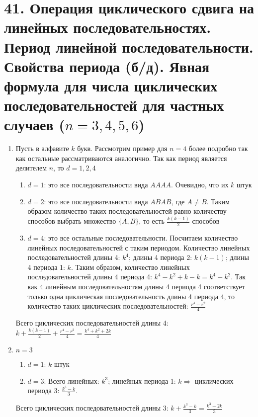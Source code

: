 \section*{41. Операция циклического сдвига на линейных последовательностях. Период линейной последовательности. Свойства периода (б/д). Явная формула для числа циклических последовательностей для частных случаев ($n = 3, 4, 5, 6$)}
\begin{enumerate}
    \item Пусть в алфавите $k$ букв. Рассмотрим пример для $n=4$ более подробно так как остальные рассматриваются аналогично. Так как период является делителем $n$, то $d=1,2,4$
\begin{enumerate}
    \item $d=1$: это все последовательности вида $AAAA$. Очевидно, что их $k$ штук
    \item $d=2$: это все последовательности вида $ABAB$, где $A \neq B$. Таким образом количество таких последовательностей равно количеству способов выбрать множество $\{A, B\}$, то есть $\frac{k(k-1)}{2}$ способов
    \item $d=4$: это все остальные последовательности. Посчитаем количество линейных последовательностей с таким периодом. Количество линейных последовательностей длины 4: $k^4$; длины 4 периода 2: $k(k-1)$; длины 4 периода 1: $k$. Таким образом, количество линейных последовательностей длины 4 периода 4: $k^4-k^2+k-k=k^4-k^2$. Так как 4 линейным последовательностям длины 4 периода 4 соответствует только одна циклическая последовательность длины 4 периода 4, то количество таких циклических последовательностей: $\frac{r^4-r^2}{4}$
\end{enumerate}
\par Всего циклических последовательностей длины 4: $k+\frac{k(k-1)}{2}+\frac{r^4-r^2}{4}=\frac{k^4+k^2+2k}{4}$
\item $n=3$
\begin{enumerate}
    \item $d=1$: $k$ штук
    \item $d=3$: Всего линейных: $k^3$; линейных периода 1: $k \Rightarrow$ циклических периода 3: $\frac{k^3-k}{3}$.
\end{enumerate}
\par Всего циклических последовательностей длины 3: $k+\frac{k^3-k}{3}=\frac{k^3+2k}{3}$


\end{enumerate}
